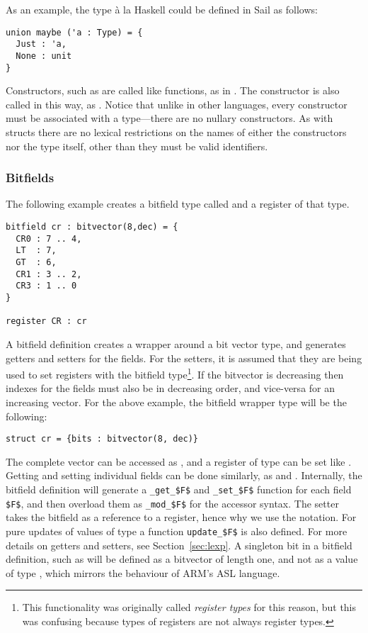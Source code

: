As an example, the  type \`{a} la Haskell could be defined
in Sail as follows:
\begin{lstlisting}
union maybe ('a : Type) = {
  Just : 'a,
  None : unit
}
\end{lstlisting}
Constructors, such as  are called like functions, as in
. The  constructor is also called in
this way, as . Notice that unlike in other languages, every
constructor must be associated with a type---there are no nullary
constructors. As with structs there are no lexical restrictions on the
names of either the constructors nor the type itself, other than they
must be valid identifiers.

\subsubsection{Bitfields}
\label{sec:bitfield}

The following example creates a bitfield type called  and a
register  of that type.

\begin{lstlisting}
bitfield cr : bitvector(8,dec) = {
  CR0 : 7 .. 4,
  LT  : 7,
  GT  : 6,
  CR1 : 3 .. 2,
  CR3 : 1 .. 0
}

register CR : cr
\end{lstlisting}

A bitfield definition creates a wrapper around a bit vector type, and
generates getters and setters for the fields. For the setters, it is
assumed that they are being used to set registers with the bitfield
type\footnote{This functionality was originally called \emph{register
    types} for this reason, but this was confusing because types of
  registers are not always register types.}. If the bitvector is
decreasing then indexes for the fields must also be in decreasing
order, and vice-versa for an increasing vector. For the above example,
the bitfield wrapper type will be the following:

\begin{lstlisting}
struct cr = {bits : bitvector(8, dec)}
\end{lstlisting}

The complete vector can be accessed as , and a register
of type  can be set like . Getting and
setting individual fields can be done similarly, as  and
. Internally, the bitfield definition will
generate a \lstinline[mathescape]{_get_$F$} and
\lstinline[mathescape]{_set_$F$} function for each field
\lstinline[mathescape]{$F$}, and then overload them as
\lstinline[mathescape]{_mod_$F$} for the accessor syntax. The setter
takes the bitfield as a reference to a register, hence why we use the
\ll{->} notation. For pure updates of values of type  a
function \lstinline[mathescape]{update_$F$} is also defined. For more
details on getters and setters, see Section~\ref{sec:lexp}. A
singleton bit in a bitfield definition, such as  will be
defined as a bitvector of length one, and not as a value of type
, which mirrors the behaviour of ARM's ASL language.

